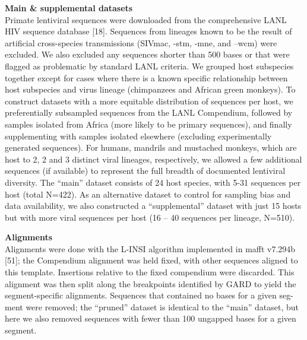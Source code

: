 \textbf{Main & supplemental datasets}\\
Primate lentiviral sequences were downloaded from the comprehensive LANL HIV sequence database [18].
Sequences from lineages known to be the result of artificial cross-species transmissions (SIVmac, -stm, -mne, and –wcm) were excluded.
We also excluded any sequences shorter than 500 bases or that were flagged as problematic by standard LANL criteria.
We grouped host subspecies together except for cases where there is a known specific relationship between host subspecies and virus lineage (chimpanzees and African green monkeys).
To construct datasets with a more equitable distribution of sequences per host, we preferentially subsampled sequences from the LANL Compendium, followed by samples isolated from Africa (more likely to be primary sequences), and finally supplementing with samples isolated elsewhere (excluding experimentally generated sequences).
For humans, mandrils and mustached monkeys, which are host to 2, 2 and 3 distinct viral lineages, respectively, we allowed a few additional sequences (if available) to represent the full breadth of documented lentiviral diversity.
The “main” dataset consists of 24 host species, with 5-31 sequences per host (total N=422).
As an alternative dataset to control for sampling bias and data availability, we also constructed a “supplemental” dataset with just 15 hosts but with more viral sequences per host (16 – 40 sequences per lineage, N=510).

\textbf{Alignments}\\
Alignments were done with the L-INSI algorithm implemented in mafft v7.294b [51]; the Compendium alignment was held fixed, with other sequences aligned to this template.
Insertions relative to the fixed compendium were discarded.
This alignment was then split along the breakpoints identified by GARD to yield the segment-specific alignments.
Sequences that contained no bases for a given seg-ment were removed; the “pruned” dataset is identical to the “main” dataset, but here we also removed sequences with fewer than 100 ungapped bases for a given segment.

